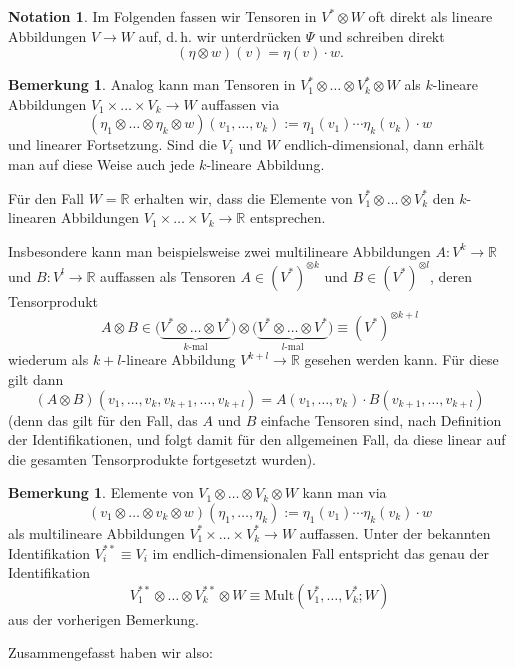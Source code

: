 \documentclass[a4paper]{scrbook}
\numberwithin{equation}{chapter}
\newcommand{\R}{\mathbb{R}}
\theoremstyle{definition}
\newtheorem{bem}[defn]{Bemerkung}
\newtheorem{nota}[defn]{Notation}
\begin{document}
\begin{nota}
	Im Folgenden fassen wir Tensoren in $V^* \otimes W$ oft direkt als lineare Abbildungen $V\to W$ auf, d.\,h. wir unterdrücken $\Psi$ und schreiben direkt
\[(\eta\otimes w)(v) = \eta(v) \cdot w.\]
\end{nota}
\begin{bem}
	Analog kann man Tensoren in $V_1^* \otimes \dots \otimes V_k^* \otimes W$ als $k$-lineare Abbildungen $V_1 \times \dots \times V_k \to W$ auffassen via
	\[(\eta_1 \otimes \dots \otimes \eta_k \otimes w)(v_1, \dots, v_k) := \eta_1(v_1) \cdots \eta_k(v_k) \cdot w\]
	und linearer Fortsetzung. Sind die $V_i$ und $W$ endlich-dimensional, dann erhält man auf diese Weise auch jede $k$-lineare Abbildung.

	Für den Fall $W = \R$ erhalten wir, dass die Elemente von $V_1^* \otimes \dots \otimes V_k^*$ den $k$-linearen Abbildungen $V_1 \times \dots \times V_k \to \R$ entsprechen.

	Insbesondere kann man beispielsweise zwei multilineare Abbildungen $A\colon V^k \to \R$ und $B\colon V^l \to \R$ auffassen als Tensoren $A \in (V^*)^{\otimes k}$ und $B \in (V^*)^{\otimes l}$, deren Tensorprodukt
	\[A\otimes B \in \big(\underbrace{V^*\otimes \dots \otimes V^*}_\text{$k$-mal}\big) \otimes \big(\underbrace{V^*\otimes \dots \otimes V^*}_\text{$l$-mal}\big) \equiv (V^*)^{\otimes {k+l}}\]
	wiederum als $k+l$-lineare Abbildung $V^{k+l} \to \R$ gesehen werden kann. Für diese gilt dann
	\[(A\otimes B)(v_1,\dots,v_k, v_{k+1},\dots,v_{k+l}) = A(v_1,\dots,v_k) \cdot B(v_{k+1},\dots,v_{k+l})\]
	(denn das gilt für den Fall, das $A$ und $B$ einfache Tensoren sind, nach Definition der Identifikationen, und folgt damit für den allgemeinen Fall, da diese linear auf die gesamten Tensorprodukte fortgesetzt wurden).
\end{bem}
\begin{bem}
	Elemente von $V_1 \otimes \dots \otimes V_k \otimes W$ kann man via
	\[(v_1 \otimes \dots \otimes v_k \otimes w)(\eta_1, \dots, \eta_k) := \eta_1(v_1) \cdots \eta_k(v_k) \cdot w\]
	als multilineare Abbildungen $V_1^* \times \dots \times V_k^* \to W$ auffassen. Unter der bekannten Identifikation $V_i^{**} \equiv V_i$ im endlich-dimensionalen Fall entspricht das genau der Identifikation
	\[V_1^{**} \otimes \dots \otimes V_k^{**} \otimes W \equiv \mathrm{Mult}(V_1^*, \dots, V_k^*; W)\]
	aus der vorherigen Bemerkung.
\end{bem}
Zusammengefasst haben wir also:
\end{document}
